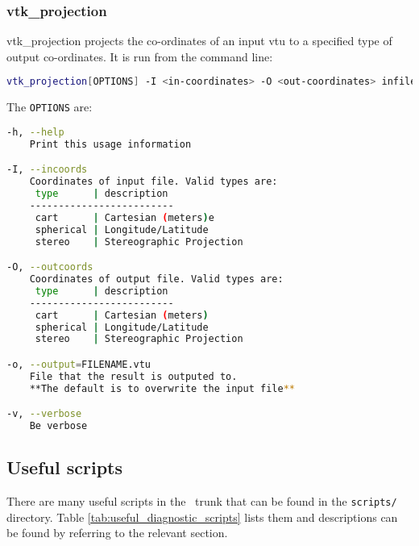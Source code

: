 
\subsubsection{vtk\_projection}
\label{sect:vtkprojection}
vtk\_projection projects the co-ordinates of an input vtu to a specified type of output co-ordinates. It is run from the command line:
\begin{lstlisting}[language = Bash]
vtk_projection[OPTIONS] -I <in-coordinates> -O <out-coordinates> infile.vtu
\end{lstlisting}

The \lstinline[language = Bash]+OPTIONS+ are:
\begin{lstlisting}[language = Bash]
-h, --help
	Print this usage information

-I, --incoords
	Coordinates of input file. Valid types are:
	 type      | description 
	-------------------------
	 cart      | Cartesian (meters)e
	 spherical | Longitude/Latitude
	 stereo    | Stereographic Projection

-O, --outcoords
	Coordinates of output file. Valid types are:
	 type      | description 
	-------------------------
	 cart      | Cartesian (meters)
	 spherical | Longitude/Latitude
	 stereo    | Stereographic Projection

-o, --output=FILENAME.vtu
	File that the result is outputed to. 
	**The default is to overwrite the input file**

-v, --verbose
	Be verbose

\end{lstlisting}


\subsection{Useful scripts}
\label{sect:diagnostics_useful_scripts}

There are many useful scripts in the \fluidity\ trunk that can be found in the \lstinline[language = bash]+scripts/+ directory. Table \ref{tab:useful_diagnostic_scripts} lists them and descriptions can be found by referring to the relevant section.


